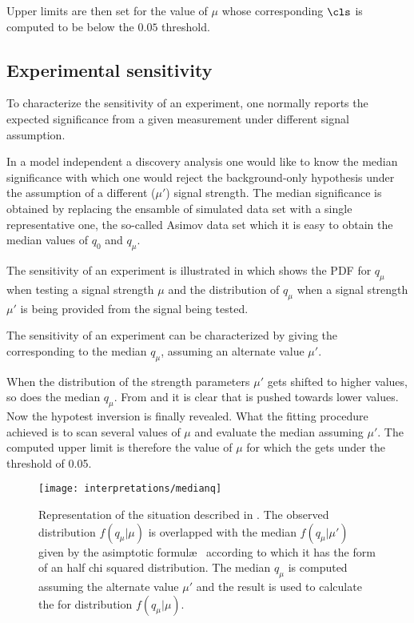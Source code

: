 Upper limits are then set for the value of $\mu$ whose corresponding $\cls$ is computed to be below the $0.05$ threshold.

\subsection{Experimental sensitivity}
\label{sec:sensitivity}
To characterize the sensitivity of an experiment, one normally reports the expected significance from a given measurement under different signal assumption.


In a model independent a discovery analysis one would like to know the median significance with which one would reject the background-only hypothesis under the assumption of a different ($\mu'$) signal strength. The median significance is obtained by replacing the ensamble of simulated data set with a single representative one, the so-called Asimov data set which it is easy to obtain the median values of $q_0$ and $q_\mu$.

The sensitivity of an experiment is illustrated in \Fig{\ref{fig:medianq}} which shows the PDF for $q_\mu$ when testing a signal strength $\mu$ and the distribution of $q_\mu$ when a signal strength $\mu'$ is being provided from the signal being tested.

The sensitivity of an experiment can be characterized by giving the \p corresponding to the median $q_\mu$, assuming an alternate value $\mu'$. 

When the distribution of the strength parameters $\mu'$ gets shifted to higher values, so does the median $q_\mu$. From \Eqn{\ref{eqn:pdaq0}} and \Eqn{\ref{eqn:pdaqmu}} it is clear that \p is pushed towards lower values. Now the hypotest inversion is finally revealed. What the fitting procedure achieved is to scan several values of $\mu$ and evaluate the median \p assuming $\mu'$. The computed upper limit is therefore the value of $\mu$ for which the \p gets under the threshold of \num{0.05}.

\begin{figure}[pt]
\centering
\texttt{[image: interpretations/medianq]}
\caption{Representation of the situation described in \Sect{\ref{sec:sensitivity}}. The observed distribution $f(q_\mu \vert \mu)$ is overlapped with the median $f(q_\mu \vert \mu')$ given by the asimptotic formul\ae~ according to which it has the form of an half chi squared distribution. The median $q_\mu$ is computed assuming the alternate value $\mu'$ and the result is used to calculate the \p for distribution $f(q_\mu \vert \mu)$.}
\label{fig:medianq}
\end{figure}

